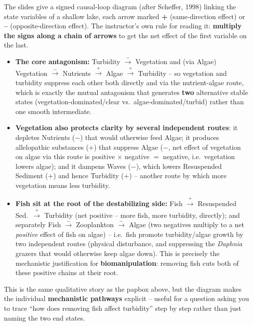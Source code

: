 \documentclass[11pt,a4paper]{article}
\begin{document}
\begin{keybox}[title={Diagram: the shallow-lake interaction web (Scheffer, 1998)}]
The slides give a signed causal-loop diagram (after Scheffer, 1998) linking the state variables of a shallow lake, each arrow marked \textbf{+} (same-direction effect) or \textbf{--} (opposite-direction effect). The instructor's own rule for reading it: \textbf{multiply the signs along a chain of arrows} to get the net effect of the first variable on the last.
\begin{itemize}[leftmargin=1.3em,nosep]
\item \textbf{The core antagonism:} Turbidity $\xrightarrow{-}$ Vegetation and (via Algae) Vegetation $\xrightarrow{-}$ Nutrients $\xrightarrow{+}$ Algae $\xrightarrow{+}$ Turbidity -- so vegetation and turbidity suppress each other both directly and via the nutrient-algae route, which is exactly the mutual antagonism that generates \textbf{two} alternative stable states (vegetation-dominated/clear vs.\ algae-dominated/turbid) rather than one smooth intermediate.
\item \textbf{Vegetation also protects clarity by several independent routes}: it depletes Nutrients ($-$) that would otherwise feed Algae; it produces allelopathic substances ($+$) that suppress Algae ($-$, net effect of vegetation on algae via this route is positive $\times$ negative $=$ negative, i.e.\ vegetation lowers algae); and it dampens Waves ($-$), which lowers Resuspended Sediment ($+$) and hence Turbidity ($+$) -- another route by which more vegetation means less turbidity.
\item \textbf{Fish sit at the root of the destabilizing side:} Fish $\xrightarrow{+}$ Resuspended Sed.\ $\xrightarrow{+}$ Turbidity (net positive -- more fish, more turbidity, directly); and separately Fish $\xrightarrow{-}$ Zooplankton $\xrightarrow{-}$ Algae (two negatives multiply to a net \emph{positive} effect of fish on algae) -- i.e.\ fish promote turbidity/algae growth by two independent routes (physical disturbance, and suppressing the \textit{Daphnia} grazers that would otherwise keep algae down). This is precisely the mechanistic justification for \textbf{biomanipulation}: removing fish cuts both of these positive chains at their root.
\end{itemize}
This is the same qualitative story as the papbox above, but the diagram makes the individual \textbf{mechanistic pathways} explicit -- useful for a question asking you to trace ``how does removing fish affect turbidity'' step by step rather than just naming the two end states.
\end{keybox}
\end{document}
